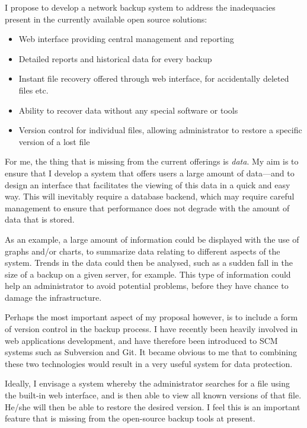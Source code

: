 \documentclass[a4paper]{article}
\begin{document}
    I propose to develop a network backup system to address the inadequacies
    present in the currently available open source solutions:

    \begin{itemize}
        \item Web interface providing central management and reporting
        \item Detailed reports and historical data for every backup
        \item Instant file recovery offered through web interface, for
            accidentally deleted files etc.
        \item Ability to recover data without any special software or tools
        \item Version control for individual files, allowing administrator to
            restore a specific version of a lost file
    \end{itemize}

    For me, the thing that is missing from the current offerings is
    \emph{data}. My aim is to ensure that I develop a system that offers users
    a large amount of data---and to design an interface that facilitates the
    viewing of this data in a quick and easy way. This will inevitably require
    a database backend, which may require careful management to ensure that
    performance does not degrade with the amount of data that is stored.

    As an example, a large amount of information could be displayed with the
    use of graphs and/or charts, to summarize data relating to different
    aspects of the system. Trends in the data could then be analysed, such as
    a sudden fall in the size of a backup on a given server, for example. This
    type of information could help an administrator to avoid potential
    problems, before they have chance to damage the infrastructure.

    Perhaps the most important aspect of my proposal however, is to include
    a form of version control in the backup process. I have recently been
    heavily involved in web applications development, and have therefore been
    introduced to SCM systems such as Subversion and Git. It became obvious to
    me that to combining these two technologies would result in a very useful
    system for data protection.

    Ideally, I envisage a system whereby the administrator searches for a file
    using the built-in web interface, and is then able to view all known
    versions of that file. He/she will then be able to restore the desired
    version. I feel this is an important feature that is missing from the
    open-source backup tools at present.
    
\end{document}
